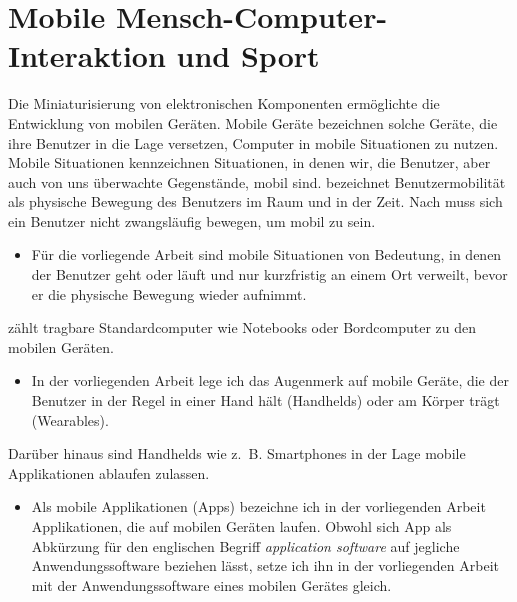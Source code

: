  

\section{Mobile Mensch-Computer-Interaktion und Sport} 

\label{sec:mobile_mensch_computer_interaktion_und_sport}

Die Miniaturisierung von elektronischen Komponenten ermöglichte die Entwicklung von mobilen Geräten. Mobile Geräte bezeichnen solche Geräte, die ihre Benutzer in die Lage versetzen, Computer in mobile Situationen zu nutzen. Mobile Situationen kennzeichnen Situationen, in denen wir, die Benutzer, aber auch von uns überwachte Gegenstände, mobil sind. \citet[][S.~24ff.]{Cooper2002} bezeichnet Benutzermobilität als physische Bewegung des Benutzers im Raum und in der Zeit. Nach \citet[][S.~7]{Roth2005} muss sich ein Benutzer nicht zwangsläufig bewegen, um mobil zu sein. 
\begin{itemize}
	
	\item Für die vorliegende Arbeit sind mobile Situationen von Bedeutung, in denen der Benutzer geht oder läuft und nur kurzfristig an einem Ort verweilt, bevor er die physische Bewegung wieder aufnimmt.
\end{itemize}

\citet[][S.~5]{Roth2005} zählt tragbare Standardcomputer wie Notebooks oder Bordcomputer zu den mobilen Geräten. 
\begin{itemize}
	
	\item In der vorliegenden Arbeit lege ich das Augenmerk auf mobile Geräte, die der Benutzer in der Regel in einer Hand hält (Handhelds) oder am Körper trägt (Wearables).
\end{itemize}

Darüber hinaus sind Handhelds wie z.~B. Smartphones in der Lage mobile Applikationen ablaufen zulassen. 
\begin{itemize}
	
	\item Als mobile Applikationen (Apps) bezeichne ich in der vorliegenden Arbeit Applikationen, die auf mobilen Geräten laufen. Obwohl sich App als Abkürzung für den englischen Begriff \emph{application software} auf jegliche Anwendungssoftware beziehen lässt, setze ich ihn in der vorliegenden Arbeit mit der Anwendungssoftware eines mobilen Gerätes gleich.
\end{itemize}

